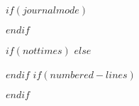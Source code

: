 \makeatletter
\renewcommand{\paragraph}{\@startsection{paragraph}{4}{\parindent}%
	{0\baselineskip \@plus 0.2ex \@minus 0.2ex}%
	{-.5em}%
	{\normalfont\normalsize\bfseries\typesectitle}}

\renewcommand{\subparagraph}[1]{\@startsection{subparagraph}{5}{0.5em}%
	{0\baselineskip \@plus 0.2ex \@minus 0.2ex}%
	{-\z@\relax}%
	{\normalfont\normalsize\bfseries\itshape\hspace{\parindent}{#1}\textit{\addperi}}{\relax}}
\makeatother

\usepackage{amsmath}


\usepackage{longtable, booktabs, multirow, multicol, colortbl, hhline, caption, array, float}


$if(journalmode)$

\usepackage{supertabular}

\renewenvironment{longtable}{\begin{supertabular}}{\end{supertabular}}
\renewcommand{\endhead}{}
\renewcommand{\endfirsthead}{}
\renewcommand{\endlastfoot}{}
\renewcommand{\toprule}[2]{\hline}
\renewcommand{\midrule}[2]{\hline}
\renewcommand{\bottomrule}[2]{\hline}

$endif$


\newlength\Oldarrayrulewidth
\newlength\Oldtabcolsep


\usepackage{hyperref}
\usepackage{float}

$if(nottimes)$
$else$
\usepackage{times}
$endif$
$if(numbered-lines)$
\usepackage{lineno}
$endif$